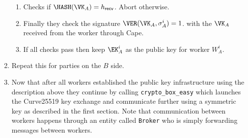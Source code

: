 \begin{enumerate}
\begin{enumerate}
    \item Checks if $\HASH(\VK_A) = h_\mathsf{recv}$. Abort otherwise.

    \item Finally they check the signature $\VER(\VK_A, \sigma^i_A) = 1$.
    with the $\VK_A$ received from the worker through Cape.

    \item If all checks pass then keep $\EK_A^i$ as the public key for worker $W_A^i$.
  \end{enumerate}

  \item Repeat this for parties on the $B$ side.

  \item Now that after all workers established the public key infrastructure
  using the description above they continue by calling \verb|crypto_box_easy|
  which launches the Curve25519 key exchange and communicate further using a
  symmetric key as described in the first section. Note that communication
  between workers happens through an entity called \verb|Broker| who is
  simply forwarding messages between workers.

\end{enumerate}



